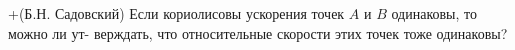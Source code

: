 +(Б.Н. Садовский)
Если кориолисовы ускорения точек $A$ и $B$ одинаковы, то можно ли ут-
верждать, что относительные скорости этих точек тоже одинаковы?
